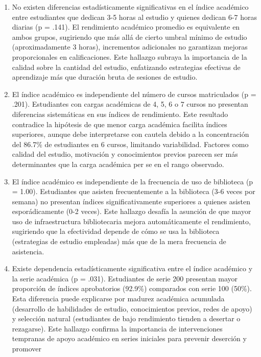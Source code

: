 \documentclass[
  stu,
  floatsintext,
  longtable,
  a4paper,
  nolmodern,
  notxfonts,
  notimes,
  12pt,
  colorlinks=true,linkcolor=blue,citecolor=blue,urlcolor=blue]{apa7}
\begin{document}
\begin{enumerate}
\def\labelenumi{\arabic{enumi}.}
\item
  No existen diferencias estadísticamente significativas en el índice
  académico entre estudiantes que dedican 3-5 horas al estudio y quienes
  dedican 6-7 horas diarias (p = .141). El rendimiento académico
  promedio es equivalente en ambos grupos, sugiriendo que más allá de
  cierto umbral mínimo de estudio (aproximadamente 3 horas), incrementos
  adicionales no garantizan mejoras proporcionales en calificaciones.
  Este hallazgo subraya la importancia de la calidad sobre la cantidad
  del estudio, enfatizando estrategias efectivas de aprendizaje más que
  duración bruta de sesiones de estudio.
\item
  El índice académico es independiente del número de cursos matriculados
  (p = .201). Estudiantes con cargas académicas de 4, 5, 6 o 7 cursos no
  presentan diferencias sistemáticas en sus índices de rendimiento. Este
  resultado contradice la hipótesis de que menor carga académica
  facilita índices superiores, aunque debe interpretarse con cautela
  debido a la concentración del 86.7\% de estudiantes en 6 cursos,
  limitando variabilidad. Factores como calidad del estudio, motivación
  y conocimientos previos parecen ser más determinantes que la carga
  académica per se en el rango observado.
\item
  El índice académico es independiente de la frecuencia de uso de
  biblioteca (p = 1.00). Estudiantes que asisten frecuentemente a la
  biblioteca (3-6 veces por semana) no presentan índices
  significativamente superiores a quienes asisten esporádicamente (0-2
  veces). Este hallazgo desafía la asunción de que mayor uso de
  infraestructura bibliotecaria mejora automáticamente el rendimiento,
  sugiriendo que la efectividad depende de cómo se usa la biblioteca
  (estrategias de estudio empleadas) más que de la mera frecuencia de
  asistencia.
\item
  Existe dependencia estadísticamente significativa entre el índice
  académico y la serie académica (p = .031). Estudiantes de serie 200
  presentan mayor proporción de índices aprobatorios (92.9\%) comparados
  con serie 100 (50\%). Esta diferencia puede explicarse por madurez
  académica acumulada (desarrollo de habilidades de estudio,
  conocimientos previos, redes de apoyo) y selección natural
  (estudiantes de bajo rendimiento tienden a desertar o rezagarse). Este
  hallazgo confirma la importancia de intervenciones tempranas de apoyo
  académico en series iniciales para prevenir deserción y promover

\end{enumerate}
\end{document}
